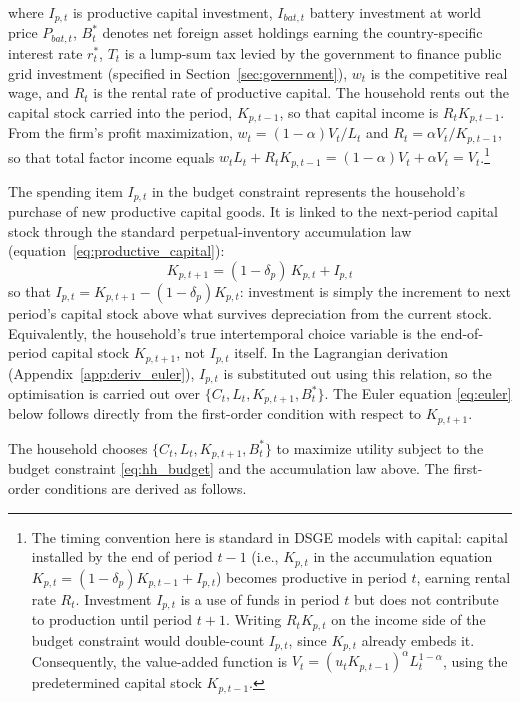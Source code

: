 \documentclass[12pt, a4paper]{article}
\begin{document}
where $I_{p,t}$ is productive capital investment, $I_{bat,t}$ battery investment at world price $P_{bat,t}$, $B^*_t$ denotes net foreign asset holdings earning the country-specific interest rate $r^*_t$, $T_t$ is a lump-sum tax levied by the government to finance public grid investment (specified in Section~\ref{sec:government}), $w_t$ is the competitive real wage, and $R_t$ is the rental rate of productive capital. The household rents out the capital stock carried into the period, $K_{p,t-1}$, so that capital income is $R_t K_{p,t-1}$. From the firm's profit maximization, $w_t = (1-\alpha)V_t/L_t$ and $R_t = \alpha V_t / K_{p,t-1}$, so that total factor income equals $w_t L_t + R_t K_{p,t-1} = (1-\alpha)V_t + \alpha V_t = V_t$.\footnote{\label{fn:timing_convention}The timing convention here is standard in DSGE models with capital: capital installed by the end of period $t-1$ (i.e., $K_{p,t}$ in the accumulation equation $K_{p,t} = (1-\delta_p)K_{p,t-1} + I_{p,t}$) becomes productive in period $t$, earning rental rate $R_t$. Investment $I_{p,t}$ is a use of funds in period $t$ but does not contribute to production until period $t+1$. Writing $R_t K_{p,t}$ on the income side of the budget constraint would double-count $I_{p,t}$, since $K_{p,t}$ already embeds it. Consequently, the value-added function is $V_t = (u_t K_{p,t-1})^\alpha L_t^{1-\alpha}$, using the predetermined capital stock $K_{p,t-1}$.}

The spending item $I_{p,t}$ in the budget constraint represents the household's purchase of new productive capital goods. It is linked to the next-period capital stock through the standard perpetual-inventory accumulation law (equation~\eqref{eq:productive_capital}):
\begin{equation*}
K_{p,t+1} = (1-\delta_p)\,K_{p,t} + I_{p,t}
\end{equation*}
\noindent so that $I_{p,t} = K_{p,t+1} - (1-\delta_p)K_{p,t}$: investment is simply the increment to next period's capital stock above what survives depreciation from the current stock. Equivalently, the household's true intertemporal choice variable is the end-of-period capital stock $K_{p,t+1}$, not $I_{p,t}$ itself. In the Lagrangian derivation (Appendix~\ref{app:deriv_euler}), $I_{p,t}$ is substituted out using this relation, so the optimisation is carried out over $\{C_t, L_t, K_{p,t+1}, B^*_t\}$. The Euler equation \eqref{eq:euler} below follows directly from the first-order condition with respect to $K_{p,t+1}$.

The household chooses $\{C_t, L_t, K_{p,t+1}, B^*_t\}$ to maximize utility subject to the budget constraint \eqref{eq:hh_budget} and the accumulation law above. The first-order conditions are derived as follows.
\end{document}
